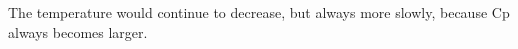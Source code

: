 The temperature would continue to decrease, but always more slowly, because Cp always becomes larger.